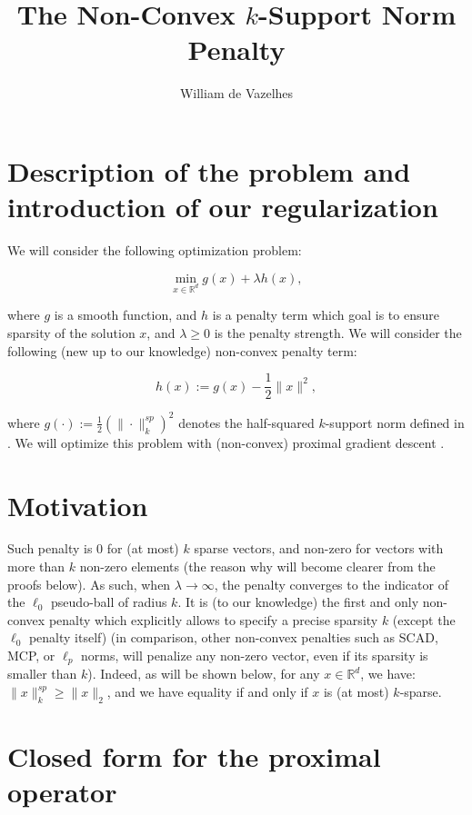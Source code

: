\documentclass{article}
\title{The Non-Convex $k$-Support Norm Penalty}
\author{William de Vazelhes}
\date{}
\begin{document}
\maketitle


\section{Description of the problem and introduction of our regularization}

We will consider the following optimization problem: 

$$ \min_{x \in \mathbb{R}^d} g(x) + \lambda h(x), $$

where $g$ is a smooth function, and $h$ is a penalty term which goal is to ensure sparsity of the solution $x$, and $\lambda \geq 0$ is the penalty strength. We will consider the following (new up to our knowledge) non-convex penalty term: 

$$h(x) := g(x) - \frac{1}{2} \|x \|^2,$$

where $g(\cdot) := \frac{1}{2}\left(\| \cdot \|^{sp}_{k}\right)^2 $ denotes the half-squared $k$-support norm defined in \cite{argyriou2012sparse}. We will optimize this problem with (non-convex) proximal gradient descent \cite{xu2019non}.


\section{Motivation}

Such penalty is $0$ for (at most) $k$ sparse vectors, and non-zero for vectors with more than $k$ non-zero elements (the reason why will become clearer from the proofs below). As such, when $\lambda \rightarrow \infty$, the penalty converges to the indicator of the $\ell_0$ pseudo-ball of radius $k$. It is (to our knowledge) the first and only non-convex penalty which explicitly allows to specify a precise sparsity $k$ (except the $\ell_0$ penalty itself) (in comparison, other non-convex penalties such as SCAD, MCP, or $\ell_p$ norms, will penalize any non-zero vector, even if its sparsity is smaller than $k$). Indeed, as will be shown below, for any $x \in \mathbb{R}^d$, we have: $\| x \|^{sp}_{k} \geq \| x\|_2$, and we have equality if and only if $x$ is (at most) $k$-sparse.

\section{Closed form for the proximal operator}
\end{document}
